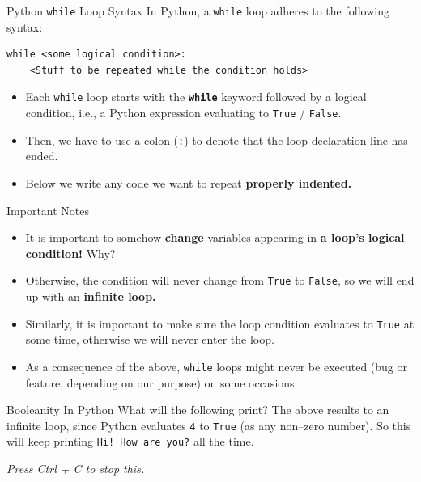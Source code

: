 \documentclass[aspectratio=169, 12pt, xcolor=table]{beamer}
\begin{document}
	\begin{frame}[fragile]{Python \texttt{while} Loop Syntax}
		In Python, a \texttt{while} loop adheres to the following syntax:
		\begin{verbatim}
while <some logical condition>:
    <Stuff to be repeated while the condition holds>
\end{verbatim}
	\begin{itemize}
		\item Each \texttt{while} loop starts with the \textbf{\texttt{while}} keyword followed by a logical condition, i.e., a Python expression evaluating to \texttt{True} / \texttt{False}.
		\item Then, we have to use a colon (\texttt{:}) to denote that the loop declaration line has ended.
		\item Below we write any code we want to repeat \textbf{properly indented.}
	\end{itemize}
	\end{frame}
	
	\begin{headsup}{Important Notes}
		\begin{itemize}
			\item It is important to somehow \textbf{change} variables appearing in \textbf{a loop's logical condition!} Why?\pause
			\item Otherwise, the condition will never change from \texttt{True} to \texttt{False}, so we will end up with an \textbf{infinite loop.}\pause
			\item Similarly, it is important to make sure the loop condition evaluates to \texttt{True} at some time, otherwise we will never enter the loop.\pause
			\item As a consequence of the above, \texttt{while} loops might never be executed (bug or feature, depending on our purpose) on some occasions.
		\end{itemize}
	\end{headsup}

	\begin{frame}{Booleanity In Python}
		What will the following print?
		\pause
		The above results to an infinite loop, since Python evaluates \texttt{4} to \texttt{True} (as any non--zero number). So this will keep printing \texttt{Hi! How are you?} all the time.
		
		\textit{Press Ctrl + C to stop this.}
	\end{frame}
\end{document}
